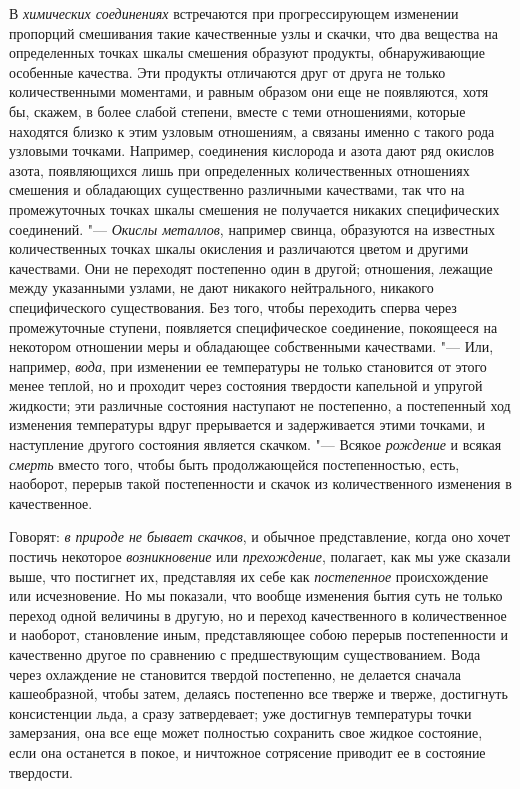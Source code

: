 В {\em химических соединениях} встречаются при
прогрессирующем изменении пропорций смешивания такие качественные узлы и
скачки, что два вещества на определенных точках шкалы смешения образуют
продукты, обнаруживающие особенные качества. Эти продукты отличаются друг
от друга не только количественными моментами, и равным образом они еще не
появляются, хотя бы, скажем, в более слабой степени, вместе с теми
отношениями, которые находятся близко к этим узловым отношениям, а связаны
именно с такого рода узловыми точками. Например, соединения кислорода и
азота дают ряд окислов азота, появляющихся лишь при определенных
количественных отношениях смешения и обладающих существенно различными
качествами, так что на промежуточных точках шкалы смешения не получается
никаких специфических соединений. "--- {\em Окислы
металлов}, например свинца, образуются на известных количественных точках
шкалы окисления и различаются цветом и другими качествами. Они не переходят
постепенно один в другой; отношения, лежащие между указанными узлами, не
дают никакого нейтрального, никакого специфического существования. Без
того, чтобы переходить сперва через промежуточные ступени, появляется
специфическое соединение, покоящееся на некотором отношении меры и
обладающее собственными качествами. "--- Или, например,
{\em вода}, при изменении ее температуры не только
становится от этого менее теплой, но и проходит через состояния твердости
капельной и упругой жидкости; эти различные состояния наступают не
постепенно, а постепенный ход изменения температуры вдруг прерывается и
задерживается этими точками, и наступление другого состояния является
скачком. "--- Всякое {\em рождение} и всякая
{\em смерть} вместо того, чтобы быть продолжающейся
постепенностью, есть, наоборот, перерыв такой постепенности и скачок из
количественного изменения в качественное.

Говорят: {\em в природе не бывает скачков}, и обычное
представление, когда оно хочет постичь некоторое
{\em возникновение} или
{\em прехождение}, полагает, как мы уже сказали выше,
что постигнет их, представляя их себе как
{\em постепенное} происхождение или исчезновение. Но мы
показали, что вообще изменения бытия суть не только переход одной величины
в другую, но и переход качественного в количественное и наоборот,
становление иным, представляющее собою перерыв постепенности и качественно
другое по сравнению с предшествующим существованием. Вода через охлаждение
не становится твердой постепенно, не делается сначала кашеобразной, чтобы
затем, делаясь постепенно все тверже и тверже, достигнуть консистенции
льда, а сразу затвердевает; уже достигнув температуры точки замерзания, она
все еще может полностью сохранить свое жидкое состояние, если она останется
в покое, и ничтожное сотрясение приводит ее в состояние твердости.

